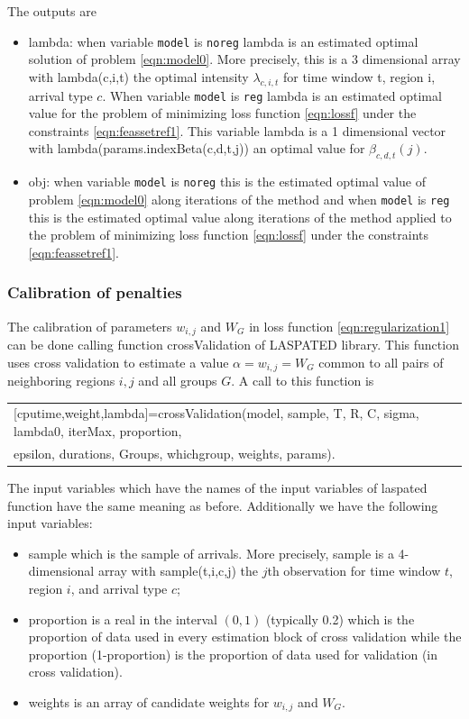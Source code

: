 \documentclass[article]{jss}
\begin{document}
{The outputs are
\begin{itemize}
\item lambda: when variable {\tt{model}}
is {\tt{noreg}} lambda is an estimated optimal solution of
problem \eqref{eqn:model0}. More precisely, this is
a 3 dimensional array with lambda(c,i,t) the optimal  intensity 
$\lambda_{c,i,t}$ for 
 time window t, region i, arrival type $c$. When variable 
 {\tt{model}}
is {\tt{reg}} lambda is an estimated optimal value
for the problem of minimizing loss function 
\eqref{eqn:lossf} under the constraints
\eqref{eqn:feassetref1}. This variable lambda
is a 1 dimensional vector with lambda(params.indexBeta(c,d,t,j))
an optimal value for $\beta_{c,d,t}(j)$. 
\item obj: when variable {\tt{model}}
is {\tt{noreg}} this is the estimated optimal value
of problem \eqref{eqn:model0} along iterations of the method and when {\tt{model}}
is {\tt{reg}} this is the estimated optimal value
along iterations of the method applied to
the problem of minimizing loss function 
\eqref{eqn:lossf} under the constraints
\eqref{eqn:feassetref1}.
\end{itemize}

\subsubsection{Calibration of penalties}

The calibration of parameters $w_{i,j}$ 
and $W_G$ in loss function 
\eqref{eqn:regularization1}
can be done calling function
crossValidation
of LASPATED library. This function uses cross validation
to estimate a value $\alpha=w_{i,j}=W_G$
common to all pairs of neighboring regions $i,j$
and  all groups $G$.
A call to this function is
\begin{center}
\begin{tabular}{l}
[cputime,weight,lambda]=crossValidation(model, sample, T, R, C, sigma, lambda0, iterMax, proportion,\\
\hspace{6.5cm}epsilon, durations, Groups, whichgroup, weights, params).
\end{tabular}
\end{center}
The input variables which have the names of the input variables
of laspated function have the same meaning as before.
Additionally we have the following input variables:
\begin{itemize}
\item sample which is the sample of arrivals.
More precisely, sample is a 
4-dimensional array with 
sample(t,i,c,j) the $j$th observation
for time window $t$, region $i$, and arrival type
$c$;
\item proportion is a real in the interval $(0,1)$
(typically 0.2) which is the proportion of data
used in every estimation block of cross validation
while the proportion (1-proportion) is the proportion of
data used for validation (in cross validation).
\item weights is an array of candidate weights
for $w_{i,j}$ and $W_G$.
\end{itemize}

}
\end{document}
